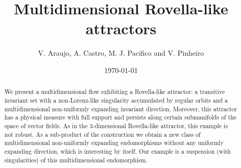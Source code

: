 \documentclass[reqno,12pt,a4paper]{amsart}
\title[Multidimensional Rovella-like attractors]
{Multidimensional Rovella-like attractors}
\author{V. Araujo, A. Castro, M. J. Pacifico and V. Pinheiro}
\date{\today}
\theoremstyle{plain}
\theoremstyle{definition}
\begin{document}
\address{V\'\i tor Ara\'ujo,
  Instituto de Matem\'atica,
  Universidade Federal do Rio de Janeiro C. P. 68.530,
  21.945-970, Rio de Janeiro, RJ-Brazil}

\address{Armando de Castro, Departamento de Matem\'atica, Universidade Federal da Bahia\\
  Av. Ademar de Barros s/n, 40170-110 Salvador, Brazil.}

\address{Maria Jos\'e Pacifico, Instituto de Matem\'atica,
Universidade Federal do Rio de Janeiro,
C. P. 68.530, 21.945-970 Rio de Janeiro, Brazil}

\address{Vilton  Pinheiro, Departamento de Matem\'atica, Universidade Federal da Bahia\\
Av. Ademar de Barros s/n, 40170-110 Salvador, Brazil.}

\begin{abstract}
  We present a multidimensional flow exhibiting a
  Rovella-like attractor: a transitive invariant set with a
  non-Lorenz-like singularity accumulated by regular orbits
  and a multidimensional non-uniformly expanding invariant
  direction.  Moreover, this attractor has a physical
  measure with full support and persists along certain
  submanifolds of the space of vector fields.  As in the
  $3$-dimensional Rovella-like attractor, this example is
  not robust.
  As a sub-product of the construction we obtain a new class
  of multidimensional non-uniformly expanding endomorphisms
  without any uniformly expanding direction, which is
  interesting by itself.
  Our example is a suspension (with singularities) of this
  multidimensional endomorphism.
  
  
  
  
  
  
  
  
  
  
  
  

  
  
 \end{abstract}



\maketitle
\end{document}
